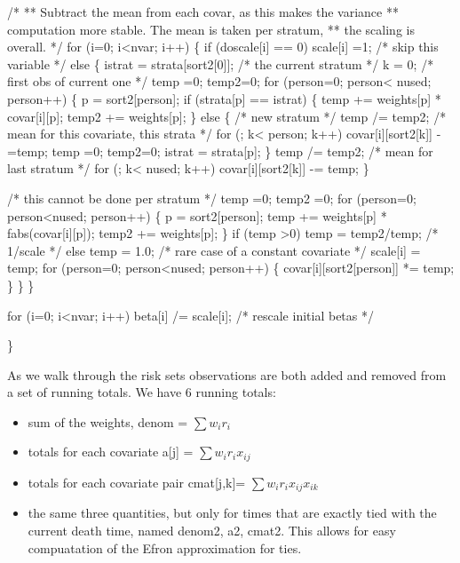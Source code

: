 \documentclass{article}
\begin{document}
\begin{nwchunk}
     /*
     ** Subtract the mean from each covar, as this makes the variance
     **  computation more stable.  The mean is taken per stratum,
     **  the scaling is overall.
     */
     for (i=0; i<nvar; i++) \{
         if (doscale[i] == 0) scale[i] =1; /* skip this variable */
         else \{
             istrat = strata[sort2[0]];  /* the current stratum */
             k = 0;                      /* first obs of current one */
             temp =0;  temp2=0;
             for (person=0; person< nused; person++) \{
                 p = sort2[person];
                 if (strata[p] == istrat) \{
                     temp += weights[p] * covar[i][p];
                 temp2 += weights[p];
                 \}
                 else \{  /* new stratum */
                     temp /= temp2;  /* mean for this covariate, this strata */
                     for (; k< person; k++) covar[i][sort2[k]] -=temp;
                     temp =0;  temp2=0;
                     istrat = strata[p];
                 \}
                 temp /= temp2;  /* mean for last stratum */
                 for (; k< nused; k++) covar[i][sort2[k]] -= temp;
             \}
 
             /* this cannot be done per stratum */
             temp =0;
             temp2 =0;
             for (person=0; person<nused; person++) \{
                 p = sort2[person];
                 temp += weights[p] * fabs(covar[i][p]);
                 temp2 += weights[p];
                 \}
             if (temp >0) temp = temp2/temp;  /* 1/scale */
             else temp = 1.0;  /* rare case of a constant covariate */
             scale[i] = temp;
             for (person=0; person<nused; person++) \{
                 covar[i][sort2[person]] *= temp;
             \}
         \}
     \}
                 
     for (i=0; i<nvar; i++) beta[i] /= scale[i]; /* rescale initial betas */
              
 \}
\end{nwchunk}

As we walk through the risk sets observations are both added and
removed from a set of running totals. 
We have 6 running totals: 
\begin{itemize}
  \item sum of the weights, denom = $\sum w_i r_i$
  \item totals for each covariate a[j] = $\sum w_ir_i x_{ij}$
  \item totals for each covariate pair cmat[j,k]=  $\sum w_ir_i x_{ij} x_{ik}$
  \item the same three quantities, but only for times that are exactly
    tied with the current death time,  named denom2, a2, cmat2.
    This allows for easy compuatation of the Efron approximation for ties.
\end{itemize}
\end{document}
